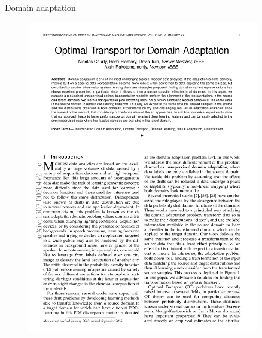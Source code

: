 \documentclass[pdf,aspectratio=169,10pt]{beamer}
\begin{document}
\begin{frame}{  Domain  adaptation}
\begin{minipage}{0.49\textwidth}
\begin{figure}
        \includegraphics[trim={1cm 21.5cm 10cm 2cm},clip, page=3, width=0.9\textwidth]{../img/OT4DA}
    \end{figure}
\end{minipage}
\hfill
\begin{minipage}{0.49\textwidth}


\end{minipage}
\end{frame}
\end{document}
